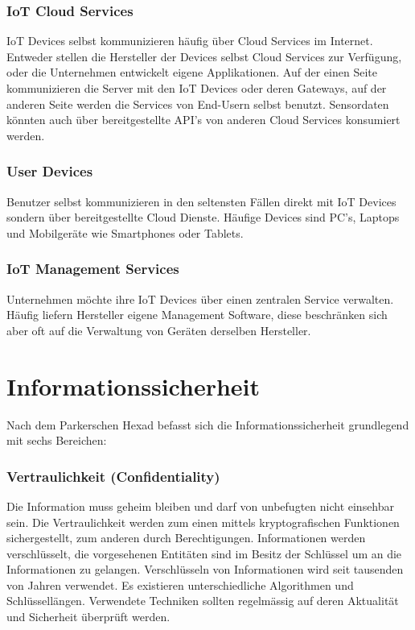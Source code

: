 \subsubsection{IoT Cloud Services}
IoT Devices selbst kommunizieren häufig über Cloud Services im Internet. Entweder stellen die Hersteller der Devices selbst Cloud Services zur Verfügung, oder die Unternehmen entwickelt eigene Applikationen. Auf der einen Seite kommunizieren die Server mit den IoT Devices oder deren Gateways, auf der anderen Seite werden die Services von End-Usern selbst benutzt. Sensordaten könnten auch über bereitgestellte API's von anderen Cloud Services konsumiert werden.

\subsubsection{User Devices}
Benutzer selbst kommunizieren in den seltensten Fällen direkt mit IoT Devices sondern über bereitgestellte Cloud Dienste. Häufige Devices sind PC's, Laptops und Mobilgeräte wie Smartphones oder Tablets.

\subsubsection{IoT Management Services}
Unternehmen möchte ihre IoT Devices über einen zentralen Service verwalten. Häufig liefern Hersteller eigene Management Software, diese beschränken sich aber oft auf die Verwaltung von Geräten derselben Hersteller.
\newpage
\section{Informationssicherheit}
Nach dem Parkerschen Hexad befasst sich die Informationssicherheit grundlegend mit sechs Bereichen: \cite{ParkerianHexad}
\subsubsection{Vertraulichkeit (Confidentiality)}
Die Information muss geheim bleiben und darf von unbefugten nicht einsehbar sein. Die Vertraulichkeit werden zum einen mittels kryptografischen Funktionen sichergestellt, zum anderen durch Berechtigungen. Informationen werden verschlüsselt, die vorgesehenen Entitäten sind im Besitz der Schlüssel um an die Informationen zu gelangen. Verschlüsseln von Informationen wird seit tausenden von Jahren verwendet. Es existieren unterschiedliche Algorithmen und Schlüssellängen. Verwendete Techniken sollten regelmässig auf deren Aktualität und Sicherheit überprüft werden.

